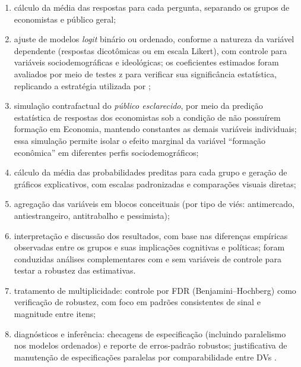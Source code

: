 \begin{enumerate}[label=\alph*)]
    \item cálculo da média das respostas para cada pergunta, separando os grupos de economistas e público geral;
    
    \item ajuste de modelos \textit{logit} binário ou ordenado, conforme a natureza da variável dependente (respostas dicotômicas ou em escala Likert), com controle para variáveis sociodemográficas e ideológicas; os coeficientes estimados foram avaliados por meio de testes z para verificar sua significância estatística, replicando a estratégia utilizada por ;
    
    \item simulação contrafactual do \textit{público esclarecido}, por meio da predição estatística de respostas dos economistas sob a condição de não possuírem formação em Economia, mantendo constantes as demais variáveis individuais; essa simulação permite isolar o efeito marginal da variável ``formação econômica'' em diferentes perfis sociodemográficos;
    
    \item cálculo da média das probabilidades preditas para cada grupo e geração de gráficos explicativos, com escalas padronizadas e comparações visuais diretas;
    
    \item agregação das variáveis em blocos conceituais (por tipo de viés: antimercado, antiestrangeiro, antitrabalho e pessimista);
    
    \item interpretação e discussão dos resultados, com base nas diferenças empíricas observadas entre os grupos e suas implicações cognitivas e políticas; foram conduzidas análises complementares com e sem variáveis de controle para testar a robustez das estimativas.

    \item tratamento de multiplicidade: controle por FDR (Benjamini–Hochberg) como verificação de robustez, com foco em padrões consistentes de sinal e magnitude entre itens;
    
    \item diagnósticos e inferência: checagens de especificação (incluindo paralelismo nos modelos ordenados) e reporte de erros-padrão robustos; justificativa de manutenção de especificações paralelas por comparabilidade entre DVs \cite{stigum2003}.

\end{enumerate}

